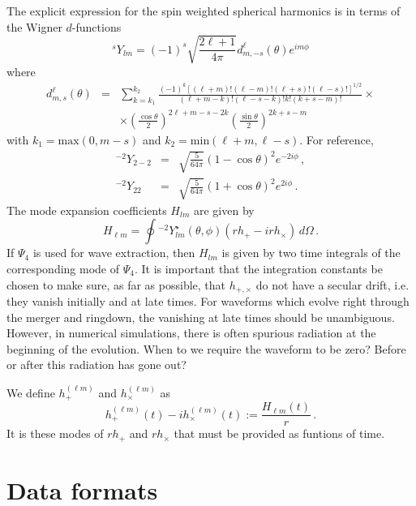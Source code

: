 \documentclass[amsmath,amssymb]{article}
\begin{document}
The explicit expression for the spin weighted spherical harmonics is
in terms of the Wigner $d$-functions
\begin{equation}
  \label{eq:5}
   {}^sY_{lm} = (-1)^s\sqrt{\frac{2\ell+1}{4\pi}} d^\ell_{m,-s}(\theta)e^{im\phi}
\end{equation}
where
\begin{eqnarray}
  \label{eq:6}
  d^\ell_{m,s}(\theta) &=& \sum_{k = k_1}^{k_2}
    \frac{(-1)^k[(\ell+m)!(\ell-m)!(\ell+s)!(\ell-s)!]^{1/2}}{(\ell +m
      -k)!(\ell-s-k)!k!(k+s-m)!} \times \\ 
    &&\times \left(\frac{\cos\theta}{2}\right)^{2\ell+m-s-2k}\left(\frac{\sin\theta}{2}\right)^{2k+s-m}  
\end{eqnarray}
with $k_1 = \textrm{max}(0, m-s)$ and $k_2=\textrm{min}(\ell+m,
\ell-s)$.  For reference,
\begin{eqnarray}
  \label{eq:7}
  {}^{-2}Y_{2-2} &=& \sqrt{\frac{5}{64\pi}}(1-\cos\theta)^2e^{-2i\phi}\,, \\
  {}^{-2}Y_{22} &=& \sqrt{\frac{5}{64\pi}}(1+\cos\theta)^2e^{2i\phi} \,.
\end{eqnarray}
The mode expansion coefficients $H_{lm}$ are given by
\begin{equation}
  \label{eq:10}
  H_{\ell m} = \oint {}^{-2}Y_{lm}^\star(\theta,\phi)(rh_+-irh_\times )\,d\Omega\,.
\end{equation}
If $\Psi_4$ is used for wave extraction, then $H_{lm}$ is given by two
time integrals of the corresponding mode of $\Psi_4$.  It is important
that the integration constants be chosen to make sure, as far as
possible, that $h_{+,\times}$ do not have a secular drift, i.e. they
vanish initially and at late times.  For waveforms which evolve right
through the merger and ringdown, the vanishing at late times should be
unambiguous.  However, in numerical simulations, there is often spurious
radiation at the beginning of the evolution.  When to we require the
waveform to be zero?  Before or after this radiation has gone out?

We define $h_+^{(\ell m)}$ and $h_\times^{(\ell m)}$ as
\begin{equation}
  \label{eq:11}
  h_+^{(\ell m)}(t) -ih_\times^{(\ell m)}(t) := \frac{H_{\ell m}(t)}{r}\,.  
\end{equation}
It is these modes of $rh_+$ and $rh_\times$ that must be provided as
funtions of time.  





\section{Data formats}
\label{sec:format}
\end{document}
